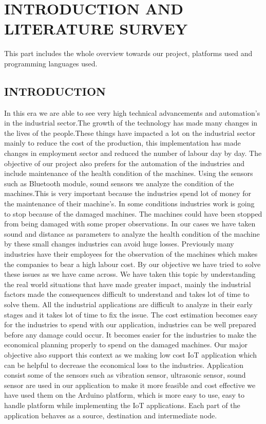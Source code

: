 \chapter{INTRODUCTION AND LITERATURE SURVEY}
This part includes the whole overview towards our project, platforms used and programming languages used.
\section{INTRODUCTION}
In this era we are able to see very high technical advancements and automation's in the industrial sector.The growth of the technology has made many changes in the lives of the people.These things have impacted a lot on the industrial sector mainly to reduce the cost of the production, this implementation has made changes in employment sector and reduced the number of labour day by day. The objective of our project also prefers for the automation of the industries and include maintenance of the health condition of the machines. Using the sensors such as Bluetooth module, sound sensors we analyze the condition of the machines.This is very important because the industries spend lot of money for the maintenance of their machine's. In some conditions industries work is going to stop because of the damaged machines. The machines could have been stopped from being damaged with some proper observations. In our cases we have taken sound and distance as  parameters to analyze the health condition of the machine by these small changes industries can avoid huge losses. Previously many industries have their employees for the observation of the machines which makes the companies to bear a high labour cost. By our objective we have tried to solve these issues as we have came across. We have taken this topic by understanding the real world situations that have made greater impact, mainly the industrial factors made the consequences difficult to understand and  takes lot of time to solve them. All the industrial applications are difficult to analyze in their early stages and it takes lot of time to fix the issue. The cost estimation becomes easy for the industries to spend with our application, industries can be well prepared before any damage could occur. It becomes easier for the industries to make the economical planning properly to spend on the damaged machines. Our major objective also support this context as we making low cost IoT application which can be helpful to decrease the economical loss to the industries. Application consist some of the sensors such as vibration sensor, ultrasonic sensor, sound sensor are used in our application to make it more feasible and cost effective we have used them on the Arduino platform, which is more easy to use, easy to handle platform while implementing the IoT applications. Each part of the application behaves as a source, destination and intermediate node. 


